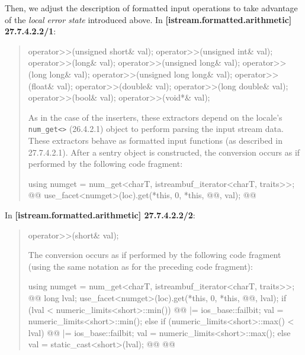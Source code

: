 \documentclass{wg21}
\begin{document}
Then, we adjust the description of formatted input operations to take advantage
of the \textit{local error state} introduced above. In \textbf{[istream.formatted.arithmetic]
27.7.4.2.2/1}:
\begin{quote}
\begin{codeblock}
operator>>(unsigned short& val);
operator>>(unsigned int& val);
operator>>(long& val);
operator>>(unsigned long& val);
operator>>(long long& val);
operator>>(unsigned long long& val);
operator>>(float& val);
operator>>(double& val);
operator>>(long double& val);
operator>>(bool& val);
operator>>(void*& val);
\end{codeblock}
As in the case of the inserters, these extractors depend on the locale's
\texttt{num_get<>} (26.4.2.1) object to perform parsing the input stream data.
These extractors behave as formatted input functions (as described in 27.7.4.2.1).
After a sentry object is constructed, the conversion occurs as if performed by
the following code fragment:

\begin{codeblock}
  using numget = num_get<charT, istreambuf_iterator<charT, traits>>;
  @@
  use_facet<numget>(loc).get(*this, 0, *this, @@, val);
  @@
\end{codeblock}
\end{quote}

In \textbf{[istream.formatted.arithmetic] 27.7.4.2.2/2}:
\begin{quote}
\begin{codeblock}
operator>>(short& val);
\end{codeblock}
The conversion occurs as if performed by the following code fragment (using the
same notation as for the preceding code fragment):
\begin{codeblock}
  using numget = num_get<charT, istreambuf_iterator<charT, traits>>;
  @@
  long lval;
  use_facet<numget>(loc).get(*this, 0, *this, @@, lval);
  if (lval < numeric_limits<short>::min()) {
    @@ |= ios_base::failbit;
    val = numeric_limits<short>::min();
  } else if (numeric_limits<short>::max() < lval) {
    @@ |= ios_base::failbit;
    val = numeric_limits<short>::max();
  }  else
    val = static_cast<short>(lval);
  @\added{\}}@
  @@
\end{codeblock}
\end{quote}
\end{document}

